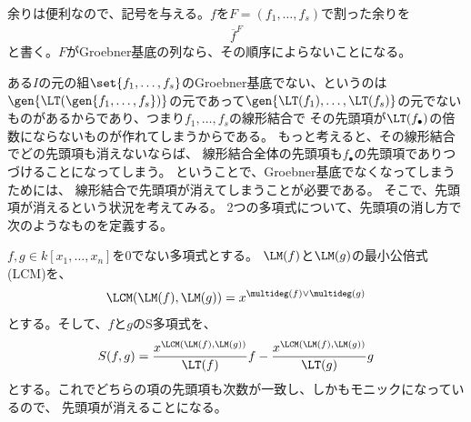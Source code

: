 余りは便利なので、記号を与える。$f$を$F=(f_1,\dots,f_s)$で割った余りを
\begin{align}
  \overline f^{F}
\end{align}
と書く。$F$がGroebner基底の列なら、その順序によらないことになる。

ある$I$の元の組$\set{f_1,\dots,f_s}$のGroebner基底でない、というのは
$\gen{\LT(\gen{f_1,\dots,f_s})}$の元であって$\gen{\LT(f_1),\dots,\LT(f_s)}$の元でないものがあるからであり、つまり$f_1,\dots,f_s$の線形結合で
その先頭項が$\LT(f_\bullet)$の倍数にならないものが作れてしまうからである。
もっと考えると、その線形結合でどの先頭項も消えないならば、
線形結合全体の先頭項も$f_\bullet$の先頭項でありつづけることになってしまう。
ということで、Groebner基底でなくなってしまうためには、
線形結合で先頭項が消えてしまうことが必要である。
そこで、先頭項が消えるという状況を考えてみる。
2つの多項式について、先頭項の消し方で次のようなものを定義する。

$f,g\in k[x_1,\dots,x_n]$を0でない多項式とする。
$\LM(f)$と$\LM(g)$の最小公倍式(LCM)を、
\begin{align}
  \LCM(\LM(f),\LM(g)) = x^{\multideg(f) \vee \multideg(g)}
\end{align}
とする。そして、$f$と$g$のS多項式を、
\begin{align}
  S(f,g) = \frac{x^{\LCM(\LM(f),\LM(g))}}{\LT(f)}f - \frac{x^{\LCM(\LM(f),\LM(g))}}{\LT(g)}g
\end{align}
とする。これでどちらの項の先頭項も次数が一致し、しかもモニックになっているので、
先頭項が消えることになる。

